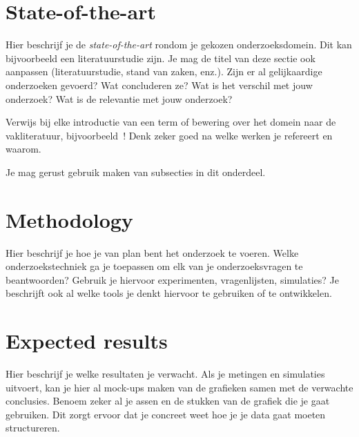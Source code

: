 \documentclass[fleqn,10pt]{voorstel}
\begin{document}

\section{State-of-the-art}
\label{sec:state-of-the-art}

Hier beschrijf je de \emph{state-of-the-art} rondom je gekozen onderzoeksdomein. Dit kan bijvoorbeeld een literatuurstudie zijn. Je mag de titel van deze sectie ook aanpassen (literatuurstudie, stand van zaken, enz.). Zijn er al gelijkaardige onderzoeken gevoerd? Wat concluderen ze? Wat is het verschil met jouw onderzoek? Wat is de relevantie met jouw onderzoek?

Verwijs bij elke introductie van een term of bewering over het domein naar de vakliteratuur, bijvoorbeeld~\autocite{Doll1954}! Denk zeker goed na welke werken je refereert en waarom.


Je mag gerust gebruik maken van subsecties in dit onderdeel.

\section{Methodology}
\label{sec:methodology}

Hier beschrijf je hoe je van plan bent het onderzoek te voeren. Welke onderzoekstechniek ga je toepassen om elk van je onderzoeksvragen te beantwoorden? Gebruik je hiervoor experimenten, vragenlijsten, simulaties? Je beschrijft ook al welke tools je denkt hiervoor te gebruiken of te ontwikkelen.

\section{Expected results}
\label{sec:expected_results}

Hier beschrijf je welke resultaten je verwacht. Als je metingen en simulaties uitvoert, kan je hier al mock-ups maken van de grafieken samen met de verwachte conclusies. Benoem zeker al je assen en de stukken van de grafiek die je gaat gebruiken. Dit zorgt ervoor dat je concreet weet hoe je je data gaat moeten structureren.
\end{document}
